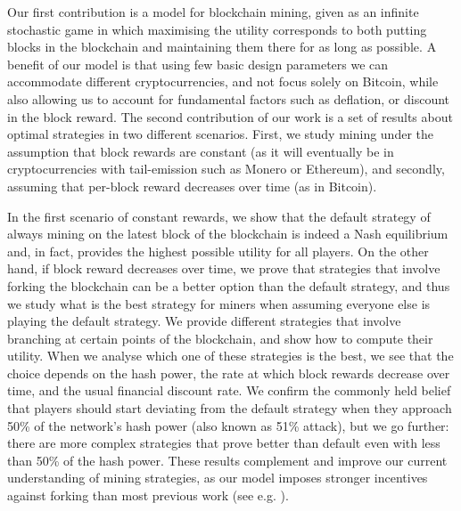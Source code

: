   Our first contribution 
is a model for blockchain mining, given as an infinite stochastic game in which maximising the utility corresponds to both 
putting blocks in the blockchain and maintaining them there for as long as possible. A
benefit of our model is that using few basic design parameters we can 
accommodate different cryptocurrencies, and not focus solely on Bitcoin,
while also allowing us to account for fundamental factors such as deflation, or discount in the block reward. 
The second contribution of our work is a set of results about optimal strategies in two different scenarios. First, 
we study mining under the assumption that block rewards are constant (as it will eventually be in cryptocurrencies with tail-emission such as Monero or Ethereum), and secondly, assuming that per-block reward decreases over time (as in Bitcoin). 

In the first scenario of constant rewards, we show that the default strategy of always mining on the latest block of the blockchain is indeed a Nash equilibrium and, in fact, 
provides the highest possible utility for all players. 
On the other hand, if block reward decreases over time, we prove that strategies that involve forking the blockchain
can be a better option than the default strategy, and thus we study what is the best strategy for miners when assuming everyone else 
is playing the default strategy. We provide different strategies that involve branching at certain points of the blockchain, and show how to compute their 
utility. When we analyse which one of these strategies is the best, we see that the choice depends on the hash power, the rate at which 
block rewards decrease over time, and the usual financial discount rate. We confirm the commonly held belief that
players should start deviating from the default strategy 
when they approach 50\% of the network's hash power (also known as 51\% attack), but we go further: there are more complex strategies that 
prove better than default even with less than 50\% of the hash power. These results complement and improve our current understanding of mining strategies, 
as our model imposes stronger 
incentives against forking than 
most previous work (see e.g. \cite{mininggames:2016,biais2018blockchain}).

